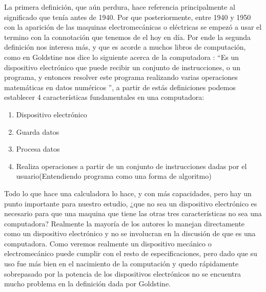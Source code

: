 \documentclass[letterpaper,12pt,oneside]{book}
\begin{document}
		La primera definición, que aún perdura, hace referencia principalmente al significado que tenía antes de 1940. Por que posteriormente, entre 1940 y 1950
		con la aparición de las maquinas electromecánicas o eléctricas se empezó a usar el termino con la connotación que tenemos de el hoy en día. Por ende
		la segunda definición nos interesa más, y que es acorde a muchos libros de computación, como  en \cite{goldstine_computer_1972} Goldstine nos dice lo siguiente 
		acerca de la computadora : ``Es un dispositivo electrónico que puede recibir un conjunto de instrucciones, o un programa,
		y entonces resolver este programa realizando varias operaciones matemáticas en datos numéricos '', a partir de estás definiciones podemos establecer
		4 características fundamentales en una computadora:
		
		\begin{enumerate}
			\item Dispositivo electrónico 
			\item Guarda datos
			\item Procesa datos
			\item Realiza operaciones a partir de un conjunto de instrucciones dadas por el usuario(Entendiendo programa como una forma de algoritmo)
		\end{enumerate}
		
		Todo lo que hace una calculadora lo hace, y con más capacidades, pero hay un punto importante para nuestro estudio, ¿que no sea un dispositivo electrónico es
		necesario para que una maquina que tiene las otras tres características	no sea una computadora? Realmente la mayoría de los autores lo manejan directamente
		como un dispositivo electrónico y no se involucran en la discusión de que es una computadora. Como veremos realmente un dispositivo mecánico o electromecánico
		puede cumplir con el resto de especificaciones, pero dado que su uso fue más bien en el nacimiento de la computación y quedo rápidamente sobrepasado
		por la potencia de los dispositivos electrónicos no se encuentra mucho problema en la definición dada por Goldstine.
		
		
\end{document}
